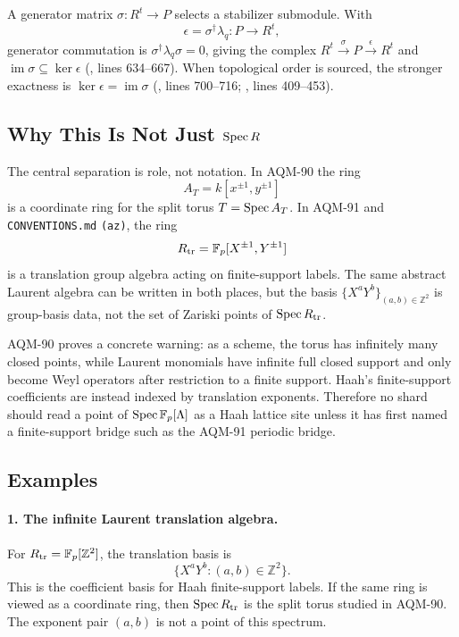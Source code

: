 A generator matrix \(\sigma:R^t\to P\) selects a stabilizer submodule.  With
\[
  \epsilon=\sigma^\dagger\lambda_q:P\to R^t,
\]
generator commutation is \(\sigma^\dagger\lambda_q\sigma=0\), giving the
complex \(R^t\xrightarrow{\sigma}P\xrightarrow{\epsilon}R^t\) and
\(\operatorname{im}\sigma\subseteq\ker\epsilon\)
(,
lines 634--667).  When topological order is sourced, the stronger exactness is
\(\ker\epsilon=\operatorname{im}\sigma\)
(,
lines 700--716;
,
lines 409--453).

\subsection{Why This Is Not Just \texorpdfstring{\(\operatorname{Spec} R\)}{Spec R}}

The central separation is role, not notation.  In AQM-90 the ring
\[
  A_T=k[x^{\pm1},y^{\pm1}]
\]
is a coordinate ring for the split torus \(T=\operatorname{Spec} A_T\).  In AQM-91 and
\texttt{CONVENTIONS.md} \texttt{(az)}, the ring
\[
  R_{\rm tr}=\mathbb F_p[X^{\pm1},Y^{\pm1}]
\]
is a translation group algebra acting on finite-support labels.  The same
abstract Laurent algebra can be written in both places, but the basis
\(\{X^aY^b\}_{(a,b)\in\mathbb Z^2}\) is group-basis data, not the set of
Zariski points of \(\operatorname{Spec} R_{\rm tr}\).

AQM-90 proves a concrete warning: as a scheme, the torus has infinitely many
closed points, while Laurent monomials have infinite full closed support and
only become Weyl operators after restriction to a finite support.  Haah's
finite-support coefficients are instead indexed by translation exponents.
Therefore no shard should read a point of \(\operatorname{Spec}\mathbb F_p[\Lambda]\) as a
Haah lattice site unless it has first named a finite-support bridge such as
the AQM-91 periodic bridge.

\subsection{Examples}

\paragraph{1. The infinite Laurent translation algebra.}
For \(R_{\rm tr}=\mathbb F_p[\mathbb Z^2]\), the translation basis is
\[
  \{X^aY^b:(a,b)\in\mathbb Z^2\}.
\]
This is the coefficient basis for Haah finite-support labels.  If the same
ring is viewed as a coordinate ring, then \(\operatorname{Spec} R_{\rm tr}\) is the split
torus studied in AQM-90.  The exponent pair \((a,b)\) is not a point of this
spectrum.


